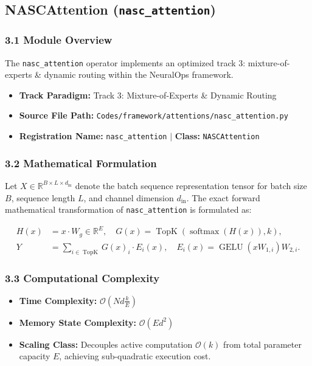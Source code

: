 \subsection{NASCAttention (\texttt{nasc\_attention})}
\label{sec:app_module_nasc_attention}

\subsubsection*{3.1 Module Overview}
The \texttt{nasc\_attention} operator implements an optimized track 3: mixture-of-experts \& dynamic routing within the NeuralOps framework.
\begin{itemize}
    \item \textbf{Track Paradigm:} Track 3: Mixture-of-Experts \& Dynamic Routing
    \item \textbf{Source File Path:} \texttt{Codes/framework/attentions/nasc\_attention.py}
    \item \textbf{Registration Name:} \texttt{nasc\_attention} $\mid$ \textbf{Class:} \texttt{NASCAttention}
\end{itemize}

\subsubsection*{3.2 Mathematical Formulation}
Let $X \in \mathbb{R}^{B \times L \times d_{\text{in}}}$ denote the batch sequence representation tensor for batch size $B$, sequence length $L$, and channel dimension $d_{\text{in}}$. The exact forward mathematical transformation of \texttt{nasc\_attention} is formulated as:

\begin{align}
H(x) &= x \cdot W_g \in \mathbb{R}^{E}, \quad G(x) = \operatorname{TopK}\left(\operatorname{softmax}(H(x)), k\right), \\
Y &= \sum_{i \in \operatorname{TopK}} G(x)_i \cdot E_i(x), \quad E_i(x) = \operatorname{GELU}(x W_{1, i}) W_{2, i}.
\end{align}


\subsubsection*{3.3 Computational Complexity}
\begin{itemize}
    \item \textbf{Time Complexity:} $\mathcal{O}(N d \frac{k}{E})$
    \item \textbf{Memory State Complexity:} $\mathcal{O}(E d^2)$
    \item \textbf{Scaling Class:} Decouples active computation $\mathcal{O}(k)$ from total parameter capacity $E$, achieving sub-quadratic execution cost.
\end{itemize}

